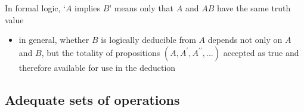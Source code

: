 \documentclass[9pt, letterpaper]{article}
\begin{document}
\begin{itemize}
\begin{item}
\begin{itemize}
\begin{itemize}
\begin{itemize}
                        \end{itemize}
                \end{itemize}
        \end{itemize}
    \end{item}
    \begin{item}
        In formal logic, `$A$ implies $B$' means only that $A$ and $AB$ have the same truth value
        \begin{itemize}
            \item{in general, whether $B$ is logically deducible from $A$ depends not only on $A$ and $B$, but the totality of propositions $\left(A, A^\prime, A^{\prime\prime}, ...  \right)$ accepted as true and therefore available for use in the deduction}
        \end{itemize}
    \end{item}
\end{itemize}

\subsection{Adequate sets of operations}
\end{document}
